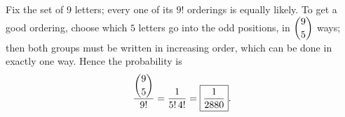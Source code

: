 Fix the set of $9$ letters; every one of its $9!$ orderings is equally likely. To get a good ordering, choose which $5$ letters go into the odd positions, in $\dbinom95$ ways; then both groups must be written in increasing order, which can be done in exactly one way. Hence the probability is
\[
\dfrac{\dbinom95}{9!}=\dfrac{1}{5!\,4!}=\boxed{\dfrac{1}{2880}} .
\]
